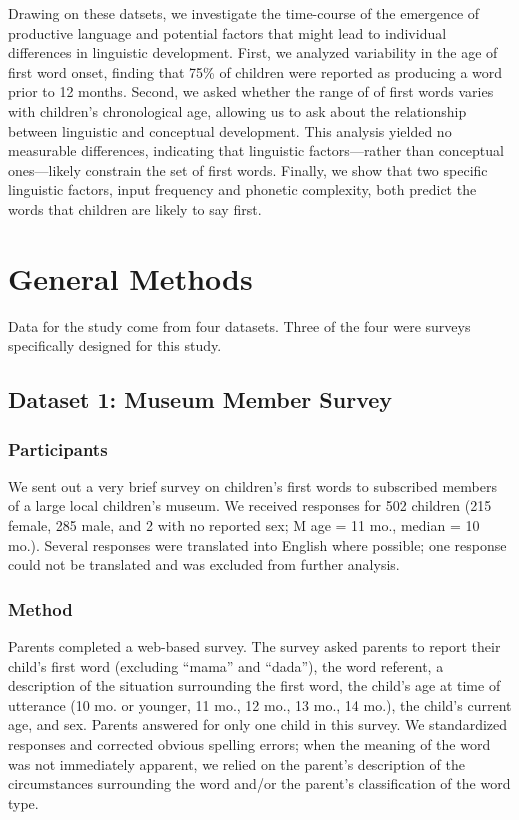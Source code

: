 \documentclass[10pt,letterpaper]{article}
\begin{document}
Drawing on these datsets, we investigate the time-course of the emergence of productive language and potential factors that might lead to individual differences in linguistic development. First, we analyzed variability in the age of first word onset, finding that 75\% of children were reported as producing a word prior to 12 months. Second, we asked whether the range of of first words varies with children's chronological age, allowing us to ask about the relationship between linguistic and conceptual development. This analysis yielded no measurable differences, indicating that linguistic factors---rather than conceptual ones---likely constrain the set of first words. Finally, we show that two specific linguistic factors, input frequency and phonetic complexity, both predict the words that children are likely to say first.

\section{General Methods}

Data for the study come from four datasets. Three of the four were surveys specifically designed for this study. 

\subsection{Dataset 1: Museum Member Survey}

\subsubsection{Participants}

We sent out a very brief survey on children's first words to subscribed members of a large local children's museum. We received responses for 502 children (215 female, 285 male, and 2 with no reported sex; M age = 11 mo., median = 10 mo.). Several responses were translated into English where possible; one response could not be translated and was excluded from further analysis. 

\subsubsection{Method}

Parents completed a web-based survey. The survey asked parents to report their child's first word (excluding ``mama'' and ``dada''), the word referent, a description of the situation surrounding the first word, the child's age at time of utterance (10 mo. or younger, 11 mo., 12 mo., 13 mo., 14 mo.), the child's current age, and sex. Parents answered for only one child in this survey. We standardized responses and corrected obvious spelling errors; when the meaning of the word was not immediately apparent, we relied on the parent's description of the circumstances surrounding the word and/or the parent's classification of the word type.
\end{document}
